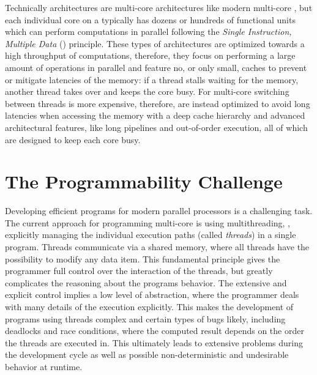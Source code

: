 Technically \GPU architectures are multi-core architectures like modern multi-core \CPUs, but each individual core on a \GPU typically has dozens or hundreds of functional units which can perform computations in parallel following the \emph{Single Instruction, Multiple Data} (\SIMD) principle.
These types of architectures are optimized towards a high throughput of computations, therefore, they focus on performing a large amount of operations in parallel and feature no, or only small, caches to prevent or mitigate latencies of the memory:
if a thread stalls waiting for the memory, another thread takes over and keeps the core busy.
For multi-core \CPUs switching between threads is more expensive, therefore, \CPUs are instead optimized to avoid long latencies when accessing the memory with a deep cache hierarchy and advanced architectural features, like long pipelines and out-of-order execution, all of which are designed to keep each core busy.

\pagebreak
\section{The Programmability Challenge}

Developing efficient programs for modern parallel processors is a challenging task.
The current approach for programming multi-core \CPUs is using multithreading, \ie, explicitly managing the individual execution paths (called \emph{threads}) in a single program.
Threads communicate via a shared memory, where all threads have the possibility to modify any data item.
This fundamental principle gives the programmer full control over the interaction of the threads, but greatly complicates the reasoning about the programs behavior.
The extensive and explicit control implies a low level of abstraction, where the programmer deals with many details of the execution explicitly.
This makes the development of programs using threads complex and certain types of bugs likely, including deadlocks and race conditions, where the computed result depends on the order the threads are executed in.
This ultimately leads to extensive problems during the development cycle as well as possible non-deterministic and undesirable behavior at runtime.

